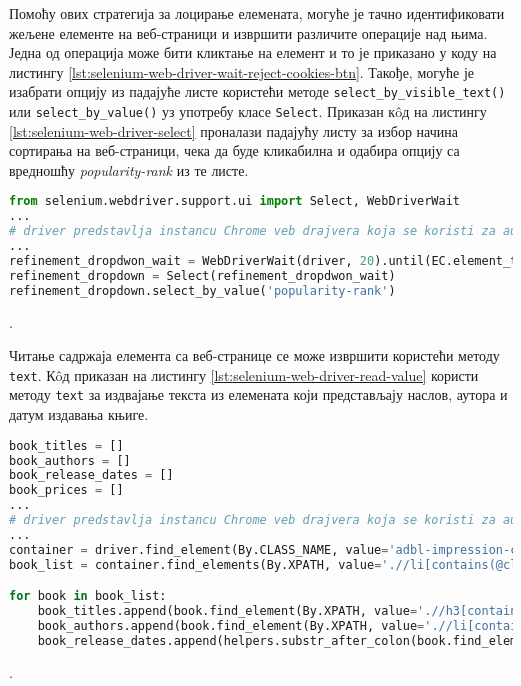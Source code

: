 \documentclass[12pt,oneside]{memoir}
\begin{document}
Помоћу ових стратегија за лоцирање елемената, могуће је тачно идентификовати жељене елементе на веб-страници и извршити различите операције над њима. Једна од операција може бити кликтање на елемент и то је приказано у коду на листингу \ref{lst:selenium-web-driver-wait-reject-cookies-btn}. Такође, могуће је изабрати опцију из падајуће листе користећи методе \texttt{select\_by\_visible\_text()} или \texttt{select\_by\_value()} уз употребу класе \texttt{Select}. Приказан кôд на листингу \ref{lst:selenium-web-driver-select} проналази падајућу листу за избор начина сортирања на веб-страници, чека да буде кликабилна и одабира опцију са вредношћу \textit{popularity-rank} из те листе.
\begin{lstlisting}[language=Python, caption={Одабир опције из падајућег менија}, label={lst:selenium-web-driver-select}]
from selenium.webdriver.support.ui import Select, WebDriverWait
...
# driver predstavlja instancu Chrome veb drajvera koja se koristi za automatizaciju pregledaca
...
refinement_dropdwon_wait = WebDriverWait(driver, 20).until(EC.element_to_be_clickable((By.XPATH, "//select[@aria-labelledby='sortBy']")))
refinement_dropdown = Select(refinement_dropdwon_wait)
refinement_dropdown.select_by_value('popularity-rank')
\end{lstlisting}.

Читање садржаја елемента са веб-странице се може извршити користећи методу \texttt{text}. Кôд приказан на листингу \ref{lst:selenium-web-driver-read-value} користи методу \texttt{text} за издвајање текста из елемената који представљају наслов, аутора и датум издавања књиге.
\begin{lstlisting}[language=Python, caption={Читање садржаја елемента}, label={lst:selenium-web-driver-read-value}]
book_titles = []
book_authors = []
book_release_dates = []
book_prices = []
...
# driver predstavlja instancu Chrome veb drajvera koja se koristi za automatizaciju pregledaca
...
container = driver.find_element(By.CLASS_NAME, value='adbl-impression-container ')
book_list = container.find_elements(By.XPATH, value='.//li[contains(@class, "productListItem")]')

for book in book_list:
    book_titles.append(book.find_element(By.XPATH, value='.//h3[contains(@class, "bc-heading")]').text.strip())
    book_authors.append(book.find_element(By.XPATH, value='.//li[contains(@class, "authorLabel")]').find_element(By.TAG_NAME, 'a').get_attribute('innerHTML'))
    book_release_dates.append(helpers.substr_after_colon(book.find_element(By.XPATH, value='.//li[contains(@class, "releaseDateLabel")]').text.strip()))
\end{lstlisting}.
\end{document}
